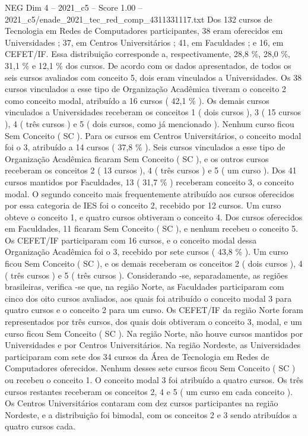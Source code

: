 \begin{textsample}{NEG Dim 4 – 2021\_c5 – Score 1.00 – 2021\_c5/enade\_2021\_tec\_red\_comp\_4311331117.txt}
Dos 132 cursos de Tecnologia em Redes de Computadores participantes, 38 eram oferecidos em Universidades ; 37, em Centros Universitários ; 41, em Faculdades ; e 16, em CEFET/IF.
Essa distribuição corresponde a, respectivamente, 28,8 \%, 28,0 \%, 31,1 \% e 12,1 \% dos cursos.
De acordo com os dados apresentados, de todos os seis cursos avaliados com conceito 5, dois eram vinculados a Universidades.
Os 38 cursos vinculados a esse tipo de Organização Acadêmica tiveram o conceito 2 como conceito modal, atribuído a 16 cursos ( 42,1 \% ).
Os demais cursos vinculados a Universidades receberam os conceitos 1 ( dois cursos ), 3 ( 15 cursos ), 4 ( três cursos ) e 5 ( dois cursos, como já mencionado ).
Nenhum curso ficou Sem Conceito ( SC ).
Para os cursos em Centros Universitários, o conceito modal foi o 3, atribuído a 14 cursos ( 37,8 \% ).
Seis cursos vinculados a esse tipo de Organização Acadêmica ficaram Sem Conceito ( SC ), e os outros cursos receberam os conceitos 2 ( 13 cursos ), 4 ( três cursos ) e 5 ( um curso ).
Dos 41 cursos mantidos por Faculdades, 13 ( 31,7 \% ) receberam conceito 3, o conceito modal.
O segundo conceito mais frequentemente atribuído aos cursos oferecidos por essa categoria de IES foi o conceito 2, recebido por 12 cursos.
Um curso obteve o conceito 1, e quatro cursos obtiveram o conceito 4.
Dos cursos oferecidos em Faculdades, 11 ficaram Sem Conceito ( SC ), e nenhum recebeu o conceito 5.
Os CEFET/IF participaram com 16 cursos, e o conceito modal dessa Organização Acadêmica foi o 3, recebido por sete cursos ( 43,8 \% ).
Um curso ficou Sem Conceito ( SC ), e os demais receberam os conceitos 2 ( dois cursos ), 4 ( três cursos ) e 5 ( três cursos ).
Considerando -se, separadamente, as regiões brasileiras, verifica -se que, na região Norte, as Faculdades participaram com cinco dos oito cursos avaliados, aos quais foi atribuído o conceito modal 3 para quatro cursos e o conceito 2 para um curso.
Os CEFET/IF da região Norte foram representados por três cursos, dos quais dois obtiveram o conceito 3, modal, e um curso ficou Sem Conceito ( SC ).
Na região Norte, não houve cursos mantidos por Universidades e por Centros Universitários.
Na região Nordeste, as Universidades participaram com sete dos 34 cursos da Área de Tecnologia em Redes de Computadores oferecidos.
Nenhum desses sete cursos ficou Sem Conceito ( SC ) ou recebeu o conceito 1.
O conceito modal 3 foi atribuído a quatro cursos.
Os três cursos restantes receberam os conceitos 2, 4 e 5 ( um curso em cada conceito ).
Os Centros Universitários contaram com dez cursos participantes na região Nordeste, e a distribuição foi bimodal, com os conceitos 2 e 3 sendo atribuídos a quatro cursos cada.

\end{textsample}
